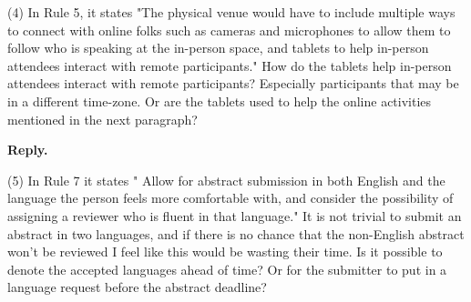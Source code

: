 \documentclass{article}
\newenvironment{Reply}{\noindent\color{BlueViolet}\textbf{Reply.}}{\vspace{1em}}
\begin{document}
(4) In Rule 5, it states "The physical venue would have to include multiple ways to connect with online folks such as cameras and microphones to allow them to follow who is speaking at the in-person space, and tablets to help in-person attendees interact with remote participants." How do the tablets help in-person attendees interact with remote participants? Especially participants that may be in a different time-zone. Or are the tablets used to help the online activities mentioned in the next paragraph?

\begin{Reply}
   
   
\end{Reply}

(5) In Rule 7 it states " Allow for abstract submission in both English and the language the person feels more comfortable with, and consider the possibility of assigning a reviewer who is fluent in that language." It is not trivial to submit an abstract in two languages, and if there is no chance that the non-English abstract won't be reviewed I feel like this would be wasting their time. Is it possible to denote the accepted languages ahead of time? Or for the submitter to put in a language request before the abstract deadline?
\end{document}
